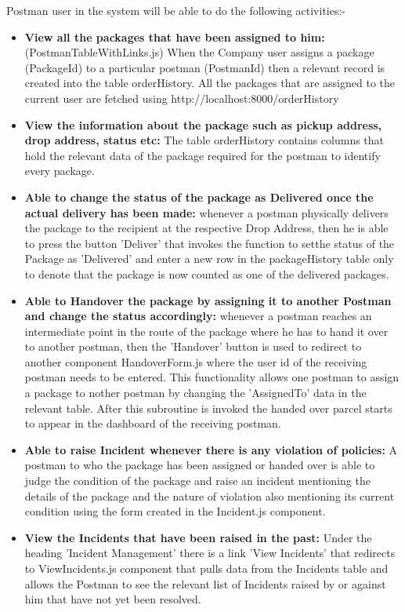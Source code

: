 Postman user in the system will be able to do the following activities:-
\begin{itemize}
\item {\textbf{View all the packages that have been assigned to him: }}(PostmanTableWithLinks.js) When the Company user assigns a package (PackageId) to a particular postman (PostmanId) then a relevant record is created into the table orderHistory. All the packages that are assigned to the current user are fetched using http://localhost:8000/orderHistory

\item \textbf{View the information about the package such as pickup address, drop address, status etc:} The table orderHistory contains columns that hold the relevant data of the package required for the postman to identify every package.
\item \textbf{Able to change the status of the package as Delivered once the actual delivery has been made:} whenever a postman physically delivers the package to the recipient at the respective Drop Address, then he is able to press the button 'Deliver' that invokes the function to setthe status of the Package as 'Delivered' and enter a new row in the packageHistory table only to denote that the package is now counted as one of the delivered packages.
\item \textbf{Able to Handover the package by assigning it to another Postman and change the status accordingly: }whenever a postman reaches an intermediate point in the route of the package where he has to hand it over to another postman, then the 'Handover' button is used to redirect to another component HandoverForm.js where the user id of the receiving postman needs to be entered. This functionality allows one postman to assign a package to nother postman by changing the 'AssignedTo' data in the relevant table. After this subroutine is invoked the handed over parcel  starts to appear in the dashboard of the receiving postman.
\item \textbf{Able to raise Incident whenever there is any violation of policies:} A postman to who the package has been assigned or handed over is able to judge the condition of the package and raise an incident mentioning the details of the package and the nature of violation also mentioning its current condition using the form created in the Incident.js component.
\item \textbf{View the Incidents that have been raised in the past: }Under the heading 'Incident Management' there is a link 'View Incidents' that redirects to ViewIncidents.js component that pulls data from the Incidents table and allows the Postman to see the relevant list of Incidents raised by or against him that have not yet been resolved.
\end{itemize}


